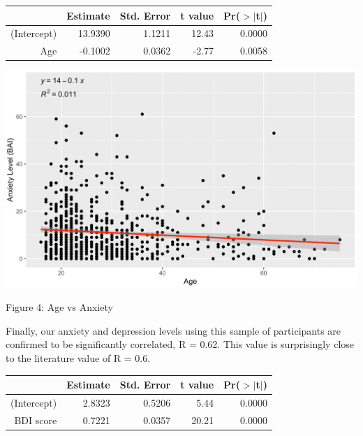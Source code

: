 \documentclass{article}
\begin{document}
\begin{table}[ht]
\centering
\begin{tabular}{rrrrr}
  \hline
 & Estimate & Std. Error & t value & Pr($>$$|$t$|$) \\ 
  \hline
(Intercept) & 13.9390 & 1.1211 & 12.43 & 0.0000 \\ 
  Age & -0.1002 & 0.0362 & -2.77 & 0.0058 \\ 
   \hline
\end{tabular}
\end{table}

\bigskip
\bigskip
\bigskip
\bigskip
\bigskip

{\centering \includegraphics[scale=0.6]{BAIAGEgraph.png} \par}

{\centering Figure 4: Age vs Anxiety \par}

\vspace*{\fill}

\pagebreak

\vspace*{\fill}

\noindent
Finally, our anxiety and depression levels using this sample of participants are confirmed to be significantly correlated, R = 0.62. This value is surprisingly close to the literature value of R = 0.6.

\begin{table}[ht]
\centering
\begin{tabular}{rrrrr}
  \hline
 & Estimate & Std. Error & t value & Pr($>$$|$t$|$) \\ 
  \hline
(Intercept) & 2.8323 & 0.5206 & 5.44 & 0.0000 \\ 
  BDI score & 0.7221 & 0.0357 & 20.21 & 0.0000 \\ 
   \hline
\end{tabular}
\end{table}
\end{document}
